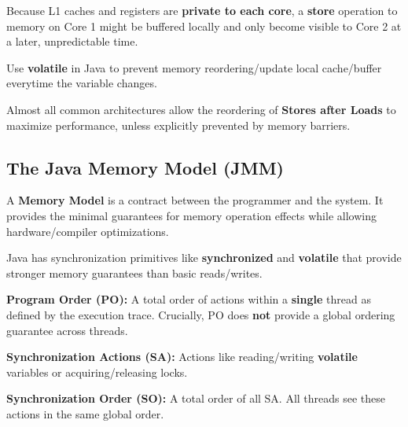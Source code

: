 \begin{remark}
    Because L1 caches and registers are \textbf{private to each core}, a \textbf{store} operation to memory on Core 1 might be buffered locally and only become visible to Core 2 at a later, unpredictable time.
\end{remark}

\begin{remark}
    Use \textbf{volatile} in Java to prevent memory reordering/update local cache/buffer everytime the variable changes.
\end{remark}

\begin{remark}
   Almost all common architectures allow the reordering of \textbf{Stores after Loads} to maximize performance, unless explicitly prevented by memory barriers.
\end{remark}

\subsection{The Java Memory Model (JMM)}

\begin{definition} 
    A \textbf{Memory Model} is a contract between the programmer and the system. It provides the minimal guarantees for memory operation effects while allowing hardware/compiler optimizations.
\end{definition}

\begin{remark}
    Java has synchronization primitives like \textbf{synchronized} and \textbf{volatile} that provide stronger memory guarantees than basic reads/writes.
\end{remark}

\begin{definition} 
    \textbf{Program Order (PO):} A total order of actions within a \textbf{single} thread as defined by the execution trace. Crucially, PO does \textbf{not} provide a global ordering guarantee across threads.
\end{definition}

\begin{definition} 
    \textbf{Synchronization Actions (SA):} Actions like reading/writing \textbf{volatile} variables or acquiring/releasing locks.
\end{definition}

\begin{definition} 
    \textbf{Synchronization Order (SO):} A total order of all SA. All threads see these actions in the same global order.
\end{definition}

